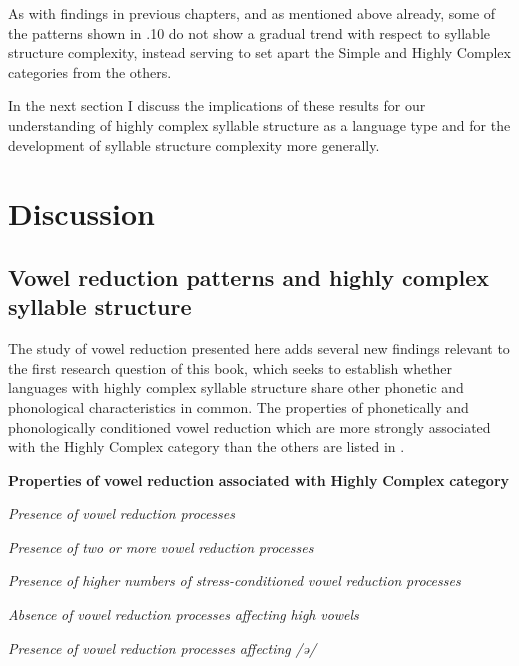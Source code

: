   As with findings in previous chapters, and as mentioned above already, some of the patterns shown in .10 do not show a gradual trend with respect to syllable structure complexity, instead serving to set apart the Simple and Highly Complex categories from the others.

  In the next section I discuss the implications of these results for our understanding of highly complex syllable structure as a language type and for the development of syllable structure complexity more generally.

\section{Discussion}\label{sec:6.4}
\subsection{Vowel reduction patterns and highly complex syllable structure}\label{sec:6.4.1}

  The study of vowel reduction presented here adds several new findings relevant to the first research question of this book, which seeks to establish whether languages with highly complex syllable structure share other phonetic and phonological characteristics in common. The properties of phonetically and phonologically conditioned vowel reduction which are more strongly associated with the Highly Complex category than the others are listed in .

\ea\label{ex:(6.20)}
  \textbf{Properties} \textbf{of} \textbf{vowel} \textbf{reduction} \textbf{associated} \textbf{with} \textbf{Highly} \textbf{Complex} \textbf{category}

\textit{Presence} \textit{of} \textit{vowel} \textit{reduction} \textit{processes}

\textit{Presence} \textit{of} \textit{two} \textit{or} \textit{more} \textit{vowel} \textit{reduction} \textit{processes}

\textit{Presence} \textit{of} \textit{higher} \textit{numbers} \textit{of} \textit{stress-conditioned} \textit{vowel} \textit{reduction} \textit{processes}

\textit{Absence} \textit{of} \textit{vowel} \textit{reduction} \textit{processes} \textit{affecting} \textit{high} \textit{vowels}

\textit{Presence} \textit{of} \textit{vowel} \textit{reduction} \textit{processes} \textit{affecting} \textit{/ə/}

